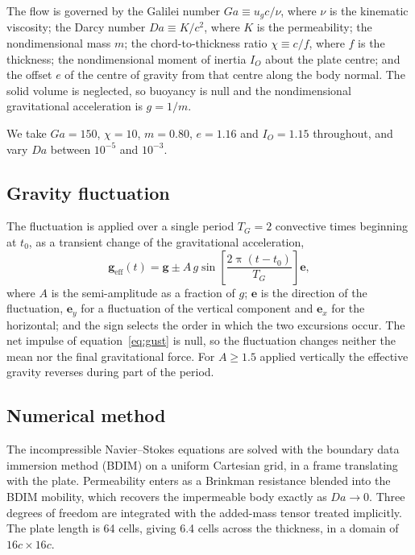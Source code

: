 \documentclass[11pt,a4paper]{article}
\begin{document}
The flow is governed by the Galilei number $Ga \equiv u_g c/\nu$, where $\nu$
is the kinematic viscosity; the Darcy number $Da \equiv K/c^2$, where $K$ is
the permeability; the nondimensional mass $m$; the chord-to-thickness ratio
$\chi \equiv c/f$, where $f$ is the thickness; the nondimensional moment of
inertia $I_O$ about the plate centre; and the offset $e$ of the centre of
gravity from that centre along the body normal. The solid volume is neglected,
so buoyancy is null and the nondimensional gravitational acceleration is
$g=1/m$.

We take $Ga=150$, $\chi=10$, $m=0.80$, $e=1.16$ and $I_O=1.15$ throughout, and
vary $Da$ between $10^{-5}$ and $10^{-3}$.

\subsection{Gravity fluctuation}

The fluctuation is applied over a single period $T_G=2$ convective times
beginning at $t_0$, as a transient change of the gravitational acceleration,
\begin{equation}
  \bm{g}_\mathrm{eff}(t) = \bm{g} \pm A\,g\sin\!\left[\frac{2\uppi(t-t_0)}{T_G}\right]\bm{e},
  \label{eq:gust}
\end{equation}
where $A$ is the semi-amplitude as a fraction of $g$; $\bm{e}$ is the
direction of the fluctuation, $\bm{e}_y$ for a fluctuation of the vertical
component and $\bm{e}_x$ for the horizontal; and the sign selects the order in
which the two excursions occur. The net impulse of equation~\eqref{eq:gust} is
null, so the fluctuation changes neither the mean nor the final gravitational
force. For $A\ge 1.5$ applied vertically the effective gravity reverses during
part of the period.

\subsection{Numerical method}

The incompressible Navier--Stokes equations are solved with the boundary data
immersion method (BDIM) on a uniform Cartesian grid, in a frame translating
with the plate. Permeability enters as a Brinkman resistance blended into the
BDIM mobility, which recovers the impermeable body exactly as $Da\to 0$. Three
degrees of freedom are integrated with the added-mass tensor treated
implicitly. The plate length is 64 cells, giving 6.4 cells across the
thickness, in a domain of $16c \times 16c$.
\end{document}
